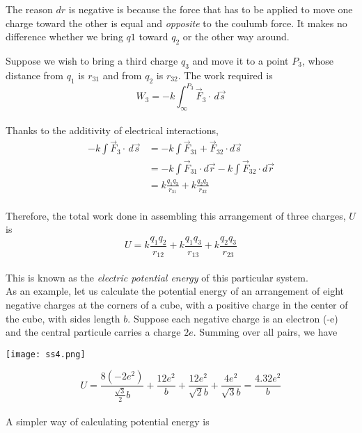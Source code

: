 \documentclass[svgnames]{article}
\begin{document}
The reason $dr$ is negative is because the force that has to be applied to move one charge toward the other is equal and \textit{opposite} to the coulumb force. It makes no difference whether we bring $q1$ toward $q_2$ or the other way around. 

Suppose we wish to bring a third charge $q_3$ and move it to a point $P_3$, whose distance from $q_1$ is $r_{31}$ and from $q_2$ is $r_{32}$. The work required is \\

\[ W_3 = - k\int_\infty^{P_3} \vec{F}_3 \cdot \, d\vec{s}  \] \\

Thanks to the additivity of electrical interactions, \\ 
\begin{align*}
-k\int \vec{F}_3 \cdot \, d\vec{s} &= -k\int \vec{F}_{31} + \vec{F}_{32} \cdot d\vec{s} \\
&= -k\int \vec{F}_{31} \cdot d\vec{r} - k\int \vec{F}_{32} \cdot d\vec{r} \\ 
&= k\frac{q_1q_3}{r_{31}} + k\frac{q_2q_3}{r_{32}} 
\end{align*} \\ 

Therefore, the total work done in assembling this arrangement of three charges, $U$ is \\

\[ U = k\frac{q_1q_2}{r_{12}} + k\frac{q_1q_3}{r_{13}} +  k\frac{q_2q_3}{r_{23}} \] \\

This is known as the \textit{electric potential energy} of this particular system. \\

As an example, let us calculate the potential energy of an arrangement of eight negative charges at the corners of a cube, with a positive charge in the center of the cube, with sides length $b$. Suppose each negative charge is an electron (-e) and the central particule carries a charge $2e$. Summing over all pairs, we have \\ 


\begin{center}
\texttt{[image: ss4.png]}
\end{center} 


\[ U = \frac{8 (-2e^2)}{\frac{\sqrt{3}}{2}b} + \frac{12e^2}{b} + \frac{12e^2}{\sqrt{2}b} + \frac{4e^2}{\sqrt{3}b} = \frac{4.32e^2}{b} \] \\

A simpler way of calculating potential energy is \\
\end{document}
